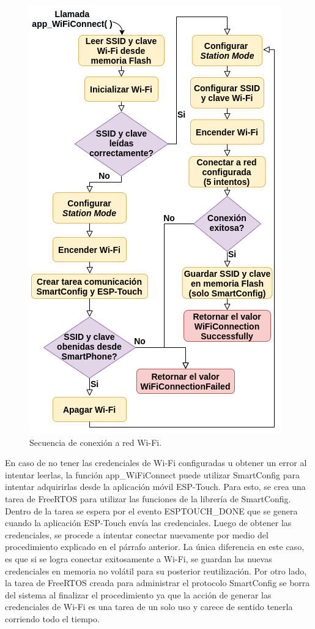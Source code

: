\begin{figure}[ht]
	\centering
	\includegraphics[scale=0.95]{./Figures/WiFi.png}
	\caption{Secuencia de conexión a red Wi-Fi.}
	\label{fig:WiFi}
\end{figure}

En caso de no tener las credenciales de Wi-Fi configuradas u obtener un error al intentar leerlas, la función app\_WiFiConnect puede utilizar SmartConfig para intentar adquirirlas desde la aplicación móvil ESP-Touch. Para esto, se crea una tarea de FreeRTOS para utilizar las funciones de la librería de SmartConfig. Dentro de la tarea se espera por el evento ESPTOUCH\_DONE que se genera cuando la aplicación ESP-Touch envía las credenciales. Luego de obtener las credenciales, se procede a intentar conectar nuevamente por medio del procedimiento explicado en el párrafo anterior. La única diferencia en este caso, es que si se logra conectar exitosamente a Wi-Fi, se guardan las nuevas credenciales en memoria no volátil para su posterior reutilización. Por otro lado, la tarea de FreeRTOS creada para administrar el protocolo SmartConfig se borra del sistema al finalizar el procedimiento ya que la acción de generar las credenciales de Wi-Fi es una tarea de un solo uso y carece de sentido tenerla corriendo todo el tiempo.


